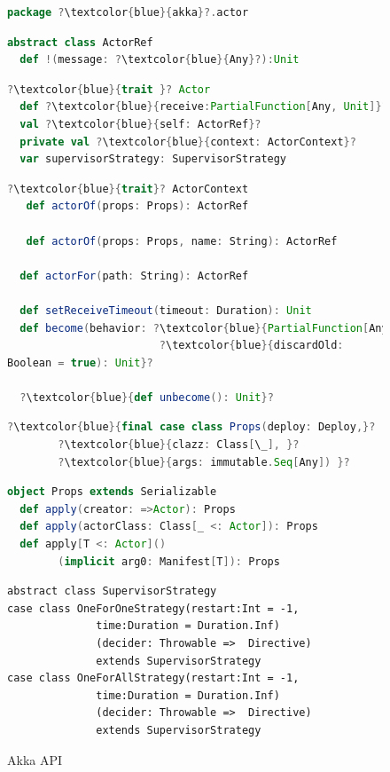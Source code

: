 \begin{figure}[!h]
\label{akka_api}
\begin{lstlisting}[language=scala, escapechar=?]
package ?\textcolor{blue}{akka}?.actor   
\end{lstlisting}
\begin{lstlisting}[language=scala, escapechar=?]
abstract class ActorRef
  def !(message: ?\textcolor{blue}{Any}?):Unit
\end{lstlisting}
\vspace{20pt}
    \begin{lstlisting}[language=scala, escapechar=?]
?\textcolor{blue}{trait }? Actor
  def ?\textcolor{blue}{receive:PartialFunction[Any, Unit]}?
  val ?\textcolor{blue}{self: ActorRef}?
  private val ?\textcolor{blue}{context: ActorContext}?
  var supervisorStrategy: SupervisorStrategy
\end{lstlisting}

      \begin{lstlisting}[language=scala, escapechar=?]
?\textcolor{blue}{trait}? ActorContext
   def actorOf(props: Props): ActorRef
   
   def actorOf(props: Props, name: String): ActorRef

  def actorFor(path: String): ActorRef
  
  def setReceiveTimeout(timeout: Duration): Unit
  def become(behavior: ?\textcolor{blue}{PartialFunction[Any, Unit]}?, 
  						?\textcolor{blue}{discardOld: 
Boolean = true): Unit}?
						
  ?\textcolor{blue}{def unbecome(): Unit}?

    \end{lstlisting}

    \begin{lstlisting}[language=scala, escapechar=?]
?\textcolor{blue}{final case class Props(deploy: Deploy,}?
		?\textcolor{blue}{clazz: Class[\_], }?
		?\textcolor{blue}{args: immutable.Seq[Any]) }?
    \end{lstlisting}
    \begin{lstlisting}[language=scala, escapechar=?]
object Props extends Serializable
  def apply(creator: =>Actor): Props
  def apply(actorClass: Class[_ <: Actor]): Props  
  def apply[T <: Actor]()
  		(implicit arg0: Manifest[T]): Props  
    \end{lstlisting}

    \begin{lstlisting}    
abstract class SupervisorStrategy
case class OneForOneStrategy(restart:Int = -1, 
              time:Duration = Duration.Inf)
              (decider: Throwable =>  Directive) 
              extends SupervisorStrategy
case class OneForAllStrategy(restart:Int = -1, 
              time:Duration = Duration.Inf)
              (decider: Throwable =>  Directive) 
              extends SupervisorStrategy
    \end{lstlisting}
    
    \caption{Akka API}
    \vspace{-20pt }
\end{figure}

